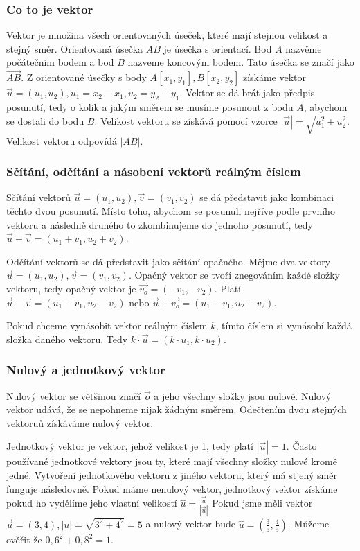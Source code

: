 \documentclass[12pt]{article}
\begin{document}
\subsubsection*{Co to je vektor}
Vektor je množina všech orientovaných úseček, které mají stejnou velikost a stejný směr. Orientovaná
úsečka $AB$ je úsečka s orientací. Bod $A$ nazvěme počátečním bodem a bod $B$ nazveme koncovým bodem.
Tato úsečka se značí jako $\overrightarrow{AB}$. Z orientované úsečky s body $A[x_1, y_1],
B[x_2, y_2]$ získáme vektor $\vec{u} = (u_1, u_2), u_1 = x_2 - x_1, u_2 = y_2 - y_1$.
Vektor se dá brát jako předpis posunutí, tedy o kolik a jakým směrem se musíme posunout z bodu $A$,
abychom se dostali do bodu $B$. Velikost vektoru se získává pomocí vzorce $|\vec{u}| =
\sqrt{u_1^2 + u_2^2}$. Velikost vektoru odpovídá $|AB|$.

\subsubsection*{Sčítání, odčítání a násobení vektorů reálným číslem}
Sčítání vektorů $\vec{u} = (u_1, u_2), \vec{v} = (v_1, v_2)$ se dá představit
jako kombinaci těchto dvou posunutí. Místo toho, abychom se posunuli nejříve podle prvního vektoru
a následně druhého to zkombinujeme do jednoho posunutí, tedy $\vec{u} + \vec{v}
= (u_1 + v_1, u_2 + v_2)$.

Odčítání vektorů se dá představit jako sčítání opačného. Mějme dva vektory $\vec{u} =
(u_1, u_2), \vec{v} = (v_1, v_2)$. Opačný vektor se tvoří znegováním každé složky vektoru,
tedy opačný vektor je $\vec{v_o} = (-v_1, -v_2)$. Platí
$\vec{u} - \vec{v} = (u_1 - v_1, u_2 - v_2)$ nebo
$\vec{u} + \vec{v_o} = (u_1 - v_1, u_2 - v_2)$.

Pokud chceme vynásobit vektor reálným číslem $k$, tímto číslem si vynásobí každá složka daného
vektoru. Tedy $k \cdot \vec{u} = (k \cdot u_1, k \cdot u_2)$.

\subsubsection*{Nulový a jednotkový vektor}
Nulový vektor se většinou značí $\vec{o}$ a jeho všechny složky jsou nulové. Nulový
vektor udává, že se nepohneme nijak žádným směrem. Odečtením dvou stejných vektoruů získáváme nulový
vektor.

Jednotkový vektor je vektor, jehož velikost je 1, tedy platí $|\vec{u}| = 1$. Často 
používané jednotkové vektory jsou ty, které mají všechny složky nulové kromě jedné. Vytvoření
jednotkového vektoru z jiného vektoru, který má stjený směr funguje následovně. Pokud máme nenulový
vektor, jednotkový vektor získáme pokud ho vydělíme jeho vlastní velikostí $\hat{u} = \frac{\vec{u}}
{|\vec{u}|}$
Pokud jsme měli vektor $\vec{u} = (3, 4), |u| = \sqrt{3^2 + 4^2} = 5$ a nulový vektor bude
$\hat{u} = (\frac{3}{5}, \frac{4}{5})$. Můžeme ověřit že $0,6^2 + 0,8^2 = 1$.
\end{document}
